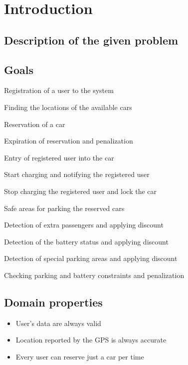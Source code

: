 \chapter{Introduction}

\section{Description of the given problem}

\section{Goals}
\begin{enumerate}[label={[G\arabic*]},labelindent=\parindent,leftmargin=*]
	\item \label{goal:registration} Registration of a user to the system
	\item \label{goal:cars_location} Finding the locations of the available cars
	\item \label{goal:reservation} Reservation of a car
	\item \label{goal:expiration} Expiration of reservation and penalization
	\item \label{goal:entry} Entry of registered user into the car
	\item \label{goal:charging} Start charging and notifying the registered user
	\item \label{goal:car_locking} Stop charging the registered user and lock the car
	\item \label{goal:safe_areas} Safe areas for parking the reserved cars
	\item \label{goal:passengers} Detection of extra passengers and applying discount
	\item \label{goal:battery} Detection of the battery status and applying discount
	\item \label{goal:special_areas} Detection of special parking areas and applying discount
	\item \label{goal:constraints} Checking parking and battery constraints and penalization
\end{enumerate}

\section{Domain properties}
\begin{itemize}
	\item User's data are always valid
	\item Location reported by the GPS is always accurate
	\item Every user can reserve just a car per time
\end{itemize}


